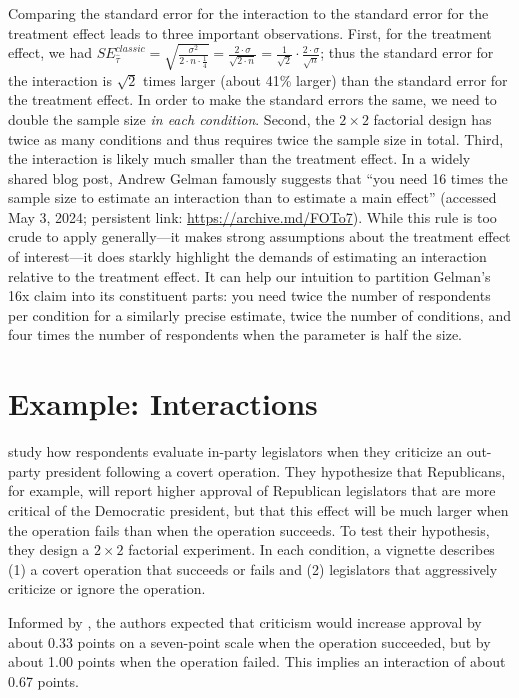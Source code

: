 \documentclass[12pt]{article}
\begin{document}
Comparing the standard error for the interaction to the standard error for the treatment effect leads to three important observations. First, for the treatment effect, we had $SE_{\widehat{\tau}}^{classic} = \sqrt{\frac{\sigma^{2}}{2 \cdot n \cdot \frac{1}{4}}} = \frac{2 \cdot \sigma}{\sqrt{2 \cdot n}} = \frac{1}{\sqrt{2}} \cdot \frac{2 \cdot \sigma}{\sqrt{n}}$; thus the standard error for the interaction is $\sqrt{2}$ times larger (about 41\% larger) than the standard error for the treatment effect. In order to make the standard errors the same, we need to double the sample size \textit{in each condition}.
Second, the $2 \times 2$ factorial design has twice as many conditions and thus requires twice the sample size in total. 
Third, the interaction is likely much smaller than the treatment effect. 
In a widely shared blog post, Andrew Gelman famously suggests that ``you
need 16 times the sample size to estimate an interaction than to
estimate a main effect'' (accessed May 3, 2024; persistent link:
\url{https://archive.md/FOTo7}). 
While this rule is too crude to apply generally---it makes strong assumptions about the treatment effect of interest---it does starkly highlight the demands of estimating an interaction relative to the treatment effect. 
It can help our intuition to partition Gelman's 16x claim into its constituent parts: you need twice the number of respondents per condition for a similarly precise estimate, twice the number of conditions, and four times the number of respondents when the parameter is half the size.

\section*{Example: Interactions}

\cite{Robbins2024} study how respondents evaluate in-party legislators when they criticize an out-party president following a covert operation. 
They hypothesize that Republicans, for example, will report higher approval of Republican legislators that are more critical of the Democratic president, but that this effect will be much larger when the operation fails than when the operation succeeds. 
To test their hypothesis, they design a $2 \times 2$ factorial experiment. 
In each condition, a vignette describes (1) a covert operation that succeeds or fails and (2) legislators that aggressively criticize or ignore the operation.

Informed by \cite{Myrick2020}, the authors expected that criticism would increase approval by about 0.33 points on a seven-point scale when the operation succeeded, but by about 1.00 points when the operation failed.
This implies an interaction of about 0.67 points.
\end{document}
